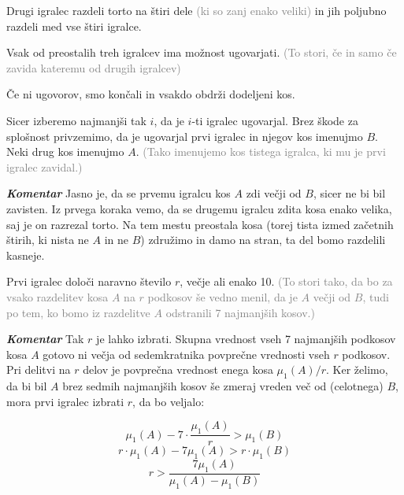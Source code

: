 \documentclass[a4paper,12pt]{article}
\begin{document}
\begin{protokol}

\item Drugi igralec razdeli torto na štiri dele \textcolor{gray}{(ki so zanj enako veliki)} in jih poljubno razdeli med vse štiri igralce.

\item Vsak od preostalih treh igralcev ima možnost ugovarjati. \textcolor{gray}{(To stori, če in samo če zavida kateremu od drugih igralcev)}

\item Če ni ugovorov, smo končali in vsakdo obdrži dodeljeni kos.

\item Sicer izberemo najmanjši tak $i$, da je $i$-ti igralec ugovarjal. Brez škode za splošnost privzemimo, da je ugovarjal prvi igralec in njegov kos imenujmo $B$. Neki drug kos imenujmo $A$. \textcolor{gray}{(Tako imenujemo kos tistega igralca, ki mu je prvi igralec zavidal.)} %

\item [\textbf{\em Komentar}] Jasno je, da se prvemu igralcu kos $A$ zdi večji od $B$, sicer ne bi bil zavisten. Iz prvega koraka vemo, da se drugemu igralcu zdita kosa enako velika, saj je on razrezal torto. Na tem mestu preostala kosa (torej tista izmed začetnih štirih, ki nista ne $A$ in ne $B$) združimo in damo na stran, ta del bomo razdelili kasneje.

\item Prvi igralec določi naravno število $r$, večje ali enako 10. \textcolor{gray}{(To stori tako, da bo za vsako razdelitev kosa $A$ na $r$ podkosov še vedno menil, da je $A$ večji od $B$, tudi po tem, ko bomo iz razdelitve $A$ odstranili 7 najmanjših kosov.)} %

\item [\textbf{\em Komentar}] Tak $r$ je lahko izbrati. Skupna vrednost vseh 7 najmanjših podkosov kosa $A$ gotovo ni večja od sedemkratnika povprečne vrednosti vseh $r$ podkosov. Pri delitvi na $r$ delov je povprečna vrednost enega kosa $\mu_1(A)/r$. Ker želimo, da bi bil $A$ brez sedmih najmanjših kosov še zmeraj vreden več od (celotnega) $B$, mora prvi igralec izbrati $r$, da bo veljalo:

$$ \mu_1(A) - 7 \cdot \frac{\mu_1(A)}{r} > \mu_1(B) $$
$$r \cdot \mu_1(A) - 7 \mu_1(A) > r \cdot \mu_1(B) $$
$$r > \frac{7 \mu_1(A)}{\mu_1(A) - \mu_1(B)} $$


\end{protokol}
\end{document}
